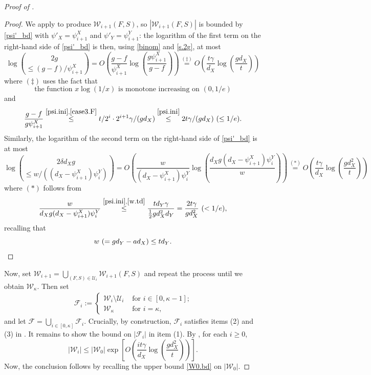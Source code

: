 \documentclass[10pt,a4paper]{amsart}
\theoremstyle{definition}
\newcommand{\cF}{\mathcal{F} }
\newcommand{\cU}{\mathcal{U} }
\newcommand{\cW}{\mathcal{W} }
\newcommand{\beq}[1]{\begin{equation}\label{#1}}
\newcommand{\enq}[0]{\end{equation}}
\newcommand{\0}[0]{\emptyset}
\begin{document}
\begin{proof}[Proof of ]
\begin{proof}
We apply  to produce $\cW_{i+1}(F,S)$, so $|\cW_{i+1}(F,S)|$ is bounded by \eqref{psi'_bd} with $\psi'_X=\psi^X_{i+1}$ and $\psi'_Y=\psi^Y_{i+1}$:  the logarithm of the first term on the right-hand side of \eqref{psi'_bd} is then, using \eqref{binom} and \eqref{s.2g}, at most
    \[\log{2g \choose \le (g-f)/\psi^X_{i+1}}=O\left(\frac{g-f}{\psi^X_{i+1}}\log \left(\frac{g\psi^X_{i+1}}{g-f}\right)\right)\stackrel{(\ddagger)}{=}O\left(\frac{t\gamma}{d_X}\log \left(\frac{gd_X}{t}\right)\right)\]
    where $(\ddagger)$ uses the fact that 
    \beq{1overx} \text{the function $x\log(1/x)$ is monotone increasing on $(0, 1/e)$}\enq
    and 
    \[\frac{g-f}{g\psi^X_{i+1}} \stackrel{\eqref{psi.ini},\eqref{case3.F}}{\le} t/2^i\cdot 2^{i+1}\gamma/(gd_X) \stackrel{\eqref{psi.ini}}{\le} 2t\gamma/(gd_X)~(\leq 1/e).\]
Similarly, the logarithm of the second term on the right-hand side of \eqref{psi'_bd} is at most
    \[\log{2\delta d_X g \choose \le w/((d_X-\psi^X_{i+1})\psi^Y_i)}=O\left(\frac{w}{(d_X-\psi^X_{i+1})\psi^Y_i}\log \left(\frac{d_X g (d_X-\psi^X_{i+1})\psi^Y_i}{w}\right)\right)\stackrel{(*)}{=}O\left(\frac{t\gamma}{d_X}\log\left(\frac{gd_X^2}{t}\right) \right)\]
where $(*)$ follows from
\[\frac{w}{d_Xg(d_X-\psi_{i+1}^X)\psi_i^Y} \stackrel{\eqref{psi.ini}, \eqref{w.td}}{\le} \frac{td_Y\gamma}{\frac{1}{2}gd_X^2d_Y}=\frac{2t\gamma}{gd_X^2}~(<1/e),\]
recalling that 
\beq{w.td} w~(=gd_Y-ad_X)\leq td_Y. \qedhere \enq
\end{proof}

Now, set $\cW_{i+1}=\bigcup_{(F,S) \in \cU_i}\cW_{i+1}(F,S)$ and repeat the process until we obtain $\cW_{\kappa}$. Then set
\begin{align}\label{eq:FiDef}
\cF_i:=\begin{cases} \cW_i \setminus \cU_i & \text{ for $i \in [0, \kappa-1]$;}\\
\cW_\kappa & \text{ for $i=\kappa$},\end{cases}
\end{align}
and let $\mathcal{F}=\bigcup_{i \in [0, \kappa]} \cF_i$. Crucially, by construction, $\cF_i$ satisfies items (2) and (3) in . It remains to show the bound on $|\cF_i|$ in item (1).
By , for each $i\geq 0$,
    \beq{total.containers}|\cW_i|\leq |\cW_0|\exp\left[O\left(\frac{it\gamma}{d_X} \log \left(\frac{gd_X^2}{t}\right)\right)\right].\enq
Now, the conclusion follows by recalling the upper bound \eqref{W0.bd} on $|\cW_0|$.\end{proof}
\end{document}
